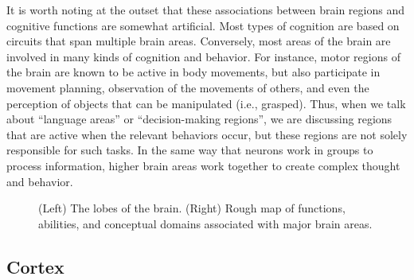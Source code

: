 It is worth noting at the outset that these associations between brain regions and cognitive functions are somewhat artificial. Most types of cognition are based on circuits that span multiple brain areas. Conversely, most areas of the brain are involved in  many kinds of cognition and behavior. For instance, motor regions of the brain are known to be active in body movements, but  also participate in movement planning, observation of the movements of others, and even the perception of objects that can be manipulated (i.e., grasped). Thus, when we talk about ``language areas'' or ``decision-making regions'', we are discussing regions that are active when the relevant behaviors occur, but these regions are not solely responsible for such tasks. In the same way that neurons work in groups to process information, higher brain areas work together to create complex thought and behavior.

\begin{figure}[h]
\centering
{}
\hspace*{.2in}
\caption[Left: Pamela Payne; Right: Pamela Payne, using text taken from the Emergent Wiki.]{(Left) The lobes of the brain. (Right) Rough map of functions, abilities, and conceptual domains associated with major brain areas.}
\label{brain_lobes}
\end{figure}

\subsection{Cortex}

